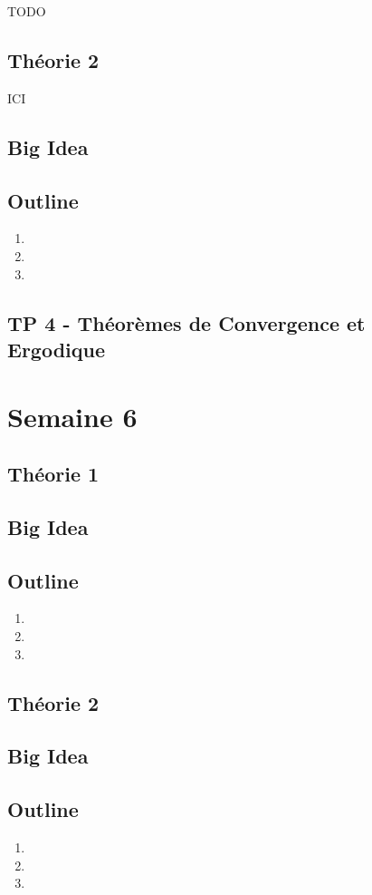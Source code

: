 \documentclass{article}
\begin{document}
TODO

\subsection{Théorie 2}
ICI
\subsection*{Big Idea}
\subsection*{Outline}
\begin{enumerate}
    \item
    \item
    \item
\end{enumerate}
\subsection{TP 4 - Théorèmes de Convergence et Ergodique}

\pagebreak
\section{Semaine 6}
\subsection{Théorie 1}
\subsection*{Big Idea}
\subsection*{Outline}
\begin{enumerate}
    \item
    \item
    \item
\end{enumerate}
\subsection{Théorie 2}
\subsection*{Big Idea}
\subsection*{Outline}
\begin{enumerate}
    \item
    \item
    \item
\end{enumerate}
\end{document}
